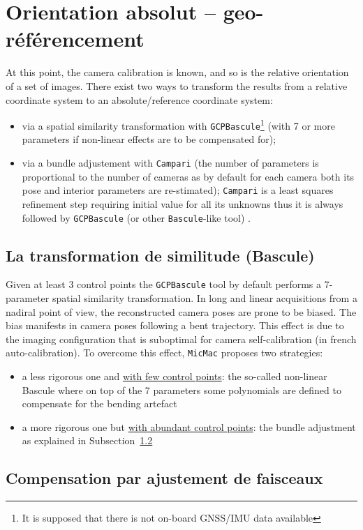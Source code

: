 \documentclass[11pt,a4paper,oneside]{book}
\begin{document}
\section{Orientation absolut -- geo-référencement}
%
At this point, the camera calibration is known, and so is the relative orientation of a set of images. There exist two ways to transform the results from a relative coordinate system to an absolute/reference coordinate system:
\begin{itemize}
\item via a spatial similarity transformation with {\tt GCPBascule}\footnote{It is supposed that there is not on-board GNSS/IMU data available} (with 7 or more parameters if non-linear effects are to be compensated for);
\item via a bundle adjustement with {\tt Campari} (the number of parameters is proportional to the number of cameras as by default for each camera both its pose and interior parameters are re-stimated); {\tt Campari} is a least squares refinement step requiring initial value for all its unknowns thus it is always followed by {\tt GCPBascule} (or other {\tt Bascule}-like tool) .
\end{itemize}
%
\subsection{La transformation de similitude (Bascule)}
%
Given at least 3 control points the {\tt GCPBascule} tool by default performs a 7-parameter spatial similarity transformation. In long and linear acquisitions from a nadiral point of view, the reconstructed camera poses are prone to be biased. The bias manifests in camera poses following a bent trajectory. This effect is due to the imaging configuration that is suboptimal for camera self-calibration (in french auto-calibration). To overcome this effect, {\tt MicMac} proposes two strategies:
\begin{itemize}
\item a less rigorous one and \underline{with few control points}: the so-called non-linear Bascule where on top of the 7 parameters some polynomials are defined to compensate for the bending artefact
\item a more rigorous one but \underline{with abundant control points}: the bundle adjustment as explained in Subsection~\ref{subsec:compensation}
\end{itemize} 
%
\subsection{Compensation par ajustement de faisceaux}\label{subsec:compensation}
\end{document}
